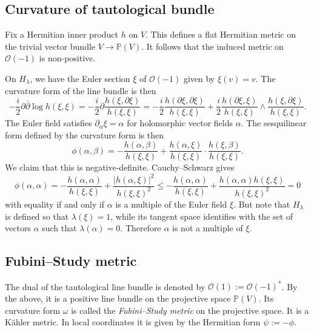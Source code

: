 \documentclass[10pt,a4paper]{article}
\newcommand{\kk}[1]{\mathbb{#1}}
\newcommand{\cc}[1]{\mathcal{#1}}
\begin{document}
\subsection{Curvature of tautological bundle}

Fix a Hermitian inner product $h$ on $V$. This defines a flat Hermitian metric on the trivial vector bundle $V \to \kk P(V)$. It follows that the induced metric on $\cc O(-1)$ is non-positive.

On $H_\lambda$, we have the Euler section $\xi$ of $\cc O(-1)$ given by $\xi(v) = v$. The curvature form of the line bundle is then
$$
-\frac i2 \partial \bar\partial \log h(\xi, \xi)
= -\frac i2\partial \frac{h(\xi, \partial \xi)}{h(\xi, \xi)}
= -\frac i2\frac{h(\partial \xi, \partial \xi)}{h(\xi, \xi)}
+ \frac i2\frac{h(\partial \xi, \xi)}{h(\xi, \xi)} \wedge \frac{h(\xi, \partial \xi)}{h(\xi, \xi)}.
$$
The Euler field satisfies $\partial_\alpha \xi = \alpha$ for holomorphic vector fields $\alpha$. The sesquilinear form defined by the curvature form is then
$$
\phi(\alpha, \beta)
= -\frac{h(\alpha, \beta)}{h(\xi, \xi)}
+ \frac{h(\alpha, \xi)}{h(\xi, \xi)} \cdot \frac{h(\xi, \beta)}{h(\xi, \xi)}.
$$
We claim that this is negative-definite. Cauchy--Schwarz gives
$$
\phi(\alpha, \alpha)
= -\frac{h(\alpha, \alpha)}{h(\xi, \xi)}
+ \frac{|h(\alpha, \xi)|^2}{h(\xi, \xi)^2}
\leq -\frac{h(\alpha, \alpha)}{h(\xi, \xi)}
+ \frac{h(\alpha, \alpha) h(\xi, \xi)}{h(\xi, \xi)^2}
= 0
$$
with equality if and only if $\alpha$ is a multiple of the Euler field $\xi$. But note that $H_\lambda$ is defined so that $\lambda(\xi) = 1$, while its tangent space identifies with the set of vectors $\alpha$ such that $\lambda(\alpha) = 0$. Therefore $\alpha$ is not a multiple of $\xi$.


\subsection{Fubini--Study metric}

The dual of the tautological line bundle is denoted by $\cc O(1) := \cc O(-1)^*$. By the above, it is a positive line bundle on the projective space $\kk P(V)$. Its curvature form $\omega$ is called the \emph{Fubini--Study metric} on the projective space. It is a K\"ahler metric. In local coordinates it is given by the Hermitian form $\psi := -\phi$.
\end{document}
